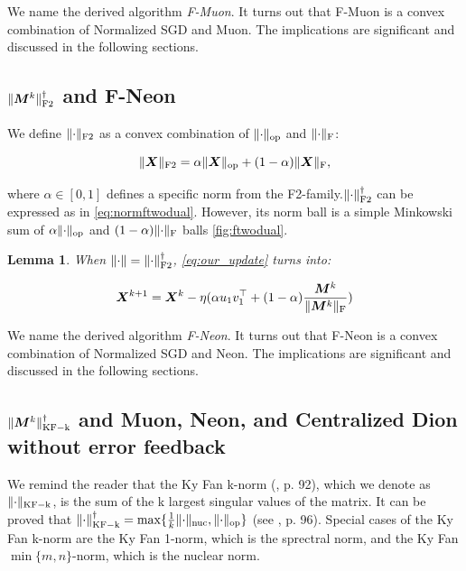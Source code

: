 \documentclass{article} %
\newtheorem{lemma}{Lemma}
\newcommand{\norm}[1]{\lVert #1\rVert}
\DeclarePairedDelimiter{\normf}{\|}{\|_\mathrm{F}}
\DeclarePairedDelimiter{\normkfk}{\|}{\|_\mathrm{KF-k}}
\DeclarePairedDelimiter{\normftwo}{\|}{\|_\mathrm{F2}}
\DeclarePairedDelimiter{\norms}{\|}{\|_{\mathrm{op}}}
\DeclarePairedDelimiter{\normn}{\|}{\|_{\mathrm{nuc}}}
\begin{document}
        We name the derived algorithm \emph{F-Muon}. It turns out that F-Muon is a convex combination of Normalized SGD and Muon. The implications are significant and discussed in the following sections.

    \subsection{\texorpdfstring{$\normftwo{\mM^{k}}^\dagger$ and F-Neon}{F-Neon}}
        We define $\normftwo{\cdot}$ as a convex combination of $\norms{\cdot}$ and $\normf{\cdot}$:

        \begin{equation}\label{eq:ftwo_norm}
            \normftwo{\mX} = \alpha \norms{\mX} + (1-\alpha)\normf{\mX},
        \end{equation}

        where $\alpha \in [0, 1]$ defines a specific norm from the F2-family.$\normftwo{\cdot}^\dagger$ can be expressed as in \cref{eq:normftwodual}. However, its norm ball is a simple Minkowski sum of $\alpha \norms{\cdot}$ and $(1-\alpha)\normf{\cdot}$ balls \cref{fig:ftwodual}.

    \begin{lemma}\label{lemma:nsgd_neon_update}    
        When $\norm{\cdot} = \normftwo{\cdot}^\dagger$, \cref{eq:our_update} turns into:

        \begin{equation}\label{eq:nsgd_neon_update}
            \mX^{k+1} = \mX^{k} - \eta (\alpha u_1 v_1^\top + (1-\alpha)\frac{\mM^k}{\normf{\mM^k}})
        \end{equation}
    \end{lemma}

        We name the derived algorithm \emph{F-Neon}. It turns out that F-Neon is a convex combination of Normalized SGD and Neon. The implications are significant and discussed in the following sections.

    
    \subsection{\texorpdfstring{$\normkfk{\mM^k}^\dagger$ and Muon, Neon, and Centralized Dion without error feedback}{Muon, Neon, and Centralized Dion without error feedback}}
        We remind the reader that the Ky Fan k-norm (\citet{bhatia2013matrix}, p. 92), which we denote as $\normkfk{\cdot}$, is the sum of the k largest singular values of the matrix. It can be proved that $\normkfk{\cdot}^\dagger = \max\{\frac{1}{k} \normn{\cdot}, \norms{\cdot}\}$ (see \citet{bhatia2013matrix}, p. 96). Special cases of the Ky Fan k-norm are the Ky Fan 1-norm, which is the sprectral norm, and the Ky Fan $\min\{m, n\}$-norm, which is the nuclear norm.
\end{document}

